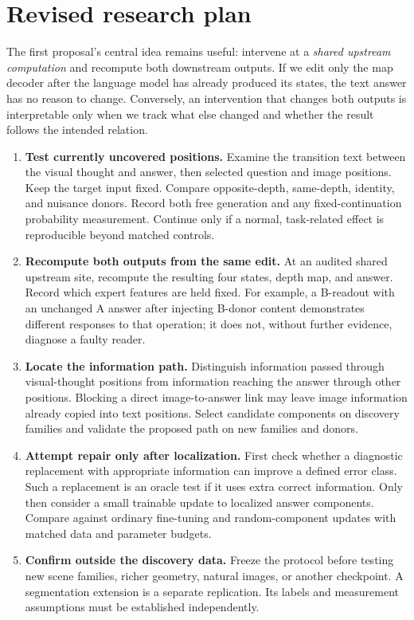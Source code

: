 \documentclass[11pt]{article}
\begin{document}
\section{Revised research plan}
The first proposal's central idea remains useful: intervene at a \emph{shared upstream computation} and recompute both downstream outputs. If we edit only the map decoder after the language model has already produced its states, the text answer has no reason to change. Conversely, an intervention that changes both outputs is interpretable only when we track what else changed and whether the result follows the intended relation.

\begin{enumerate}[leftmargin=*]
\item \textbf{Test currently uncovered positions.} Examine the transition text between the visual thought and answer, then selected question and image positions. Keep the target input fixed. Compare opposite-depth, same-depth, identity, and nuisance donors. Record both free generation and any fixed-continuation probability measurement. Continue only if a normal, task-related effect is reproducible beyond matched controls.
\item \textbf{Recompute both outputs from the same edit.} At an audited shared upstream site, recompute the resulting four states, depth map, and answer. Record which expert features are held fixed. For example, a B-readout with an unchanged A answer after injecting B-donor content demonstrates different responses to that operation; it does not, without further evidence, diagnose a faulty reader.
\item \textbf{Locate the information path.} Distinguish information passed through visual-thought positions from information reaching the answer through other positions. Blocking a direct image-to-answer link may leave image information already copied into text positions. Select candidate components on discovery families and validate the proposed path on new families and donors.
\item \textbf{Attempt repair only after localization.} First check whether a diagnostic replacement with appropriate information can improve a defined error class. Such a replacement is an oracle test if it uses extra correct information. Only then consider a small trainable update to localized answer components. Compare against ordinary fine-tuning and random-component updates with matched data and parameter budgets.
\item \textbf{Confirm outside the discovery data.} Freeze the protocol before testing new scene families, richer geometry, natural images, or another checkpoint. A segmentation extension is a separate replication. Its labels and measurement assumptions must be established independently.
\end{enumerate}
\end{document}
